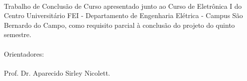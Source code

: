 %
%
\thispagestyle{empty}%

	\begin{center}
    
		\small\textbf{\expandafter\uppercase\expandafter{\theauthor}}\\
		\vspace*{3.0 cm}%
		\normalsize\textbf{\expandafter\uppercase\expandafter{\thetitle}}
		
    \end{center}
	
	\vspace*{0.35 cm}%
		    \large%
    		\hfill%
	    	\begin{minipage}{8 cm}%
	    		\begin{small} %
	    		\setlength{\baselineskip}{0.7\baselineskip}
				
		    	{Trabalho de Conclusão de Curso apresentado junto ao Curso de {Eletrônica I}
		    	{} do {Centro Universitário FEI}{ - }{Departamento de Engenharia Elétrica - Campus São Bernardo do Campo}, como requisito parcial à conclusão do projeto do quinto semestre.}\\
		    	{}
		    	\vspace*{0.6 cm}
		    	\\
		    	Orientadores:\\ \\
		    	{Prof. Dr.}{ }{ Aparecido Sirley Nicolett.}		
				
				\end{small} %
		    \end{minipage}%
		    	
		    \vspace*{0.6 cm}%
		    
		    \large%
    		\hfill%
	    	 
		    
		    \normalsize %
		    \vspace*{1.5 cm}%
		    
